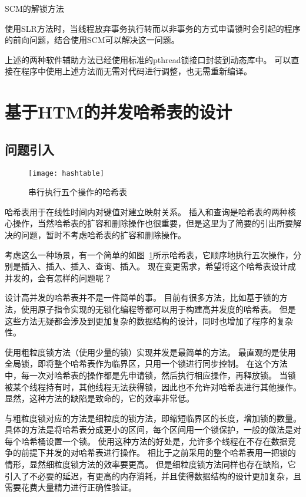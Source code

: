 \begin{algorithm}[htbp]
\caption{SCM的解锁方法}
\label{algo:scm_unlock}
\end{algorithm}
使用SLR方法时，当线程放弃事务执行转而以非事务的方式申请锁时会引起的程序的前向问题，结合使用SCM可以解决这一问题。

上述的两种软件辅助方法已经使用标准的pthread锁接口封装到动态库中。
可以直接在程序中使用上述方法而无需对代码进行调整，也无需重新编译。
\section{基于HTM的并发哈希表的设计}

\subsection{问题引入}

\begin{figure}[htbp]
\centering
\texttt{[image: hashtable]}
\caption{串行执行五个操作的哈希表}\label{fig:hashtable}
\end{figure}

哈希表用于在线性时间内对键值对建立映射关系。
插入和查询是哈希表的两种核心操作，当然哈希表的扩容和删除操作也很重要，但是这里为了简要的引出所要解决的问题，暂时不考虑哈希表的扩容和删除操作。

考虑这么一种场景，有一个简单的如图~\ref{fig:hashtable}所示哈希表，它顺序地执行五次操作，分别是插入、插入、插入、查询、插入。
现在变更需求，希望将这个哈希表设计成并发的，会有怎样的问题呢？

设计高并发的哈希表并不是一件简单的事。
目前有很多方法，比如基于锁的方法，使用原子指令实现的无锁化编程等都可以用于构建高并发度的哈希表。
但是这些方法无疑都会涉及到更加复杂的数据结构的设计，同时也增加了程序的复杂性。

使用粗粒度锁方法（使用少量的锁）实现并发是最简单的方法。
最直观的是使用全局锁，即将整个哈希表作为临界区，只用一个锁进行同步控制。
在这个方法中，每一次对哈希表的操作都是先申请锁，然后执行相应操作，再释放锁。
当锁被某个线程持有时，其他线程无法获得锁，因此也不允许对哈希表进行其他操作。
显然，这种方法的缺陷是致命的，它的效率非常低。

与粗粒度锁对应的方法是细粒度的锁方法，即缩短临界区的长度，增加锁的数量。
具体的方法是将哈希表分成更小的区间，每个区间用一个锁保护，一般的做法是对每个哈希桶设置一个锁。
使用这种方法的好处是，允许多个线程在不存在数据竞争的前提下并发的对哈希表进行操作。
相比于之前采用的整个哈希表用一把锁的情形，显然细粒度锁方法的效率要更高。
但是细粒度锁方法同样也存在缺陷，它引入了不必要的延迟，有更高的内存消耗，并且使得数据结构的设计更加复杂，且需要花费大量精力进行正确性验证。

